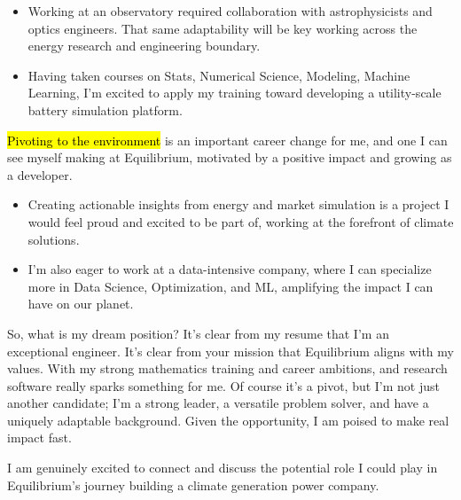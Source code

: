 \documentclass{tc_cv}
\begin{document}
\begin{adjustwidth}{38pt}{38pt}
\begin{itemize}
    \item Working at an observatory required collaboration with astrophysicists
      and optics engineers. That same adaptability will be key working across
      the energy research and engineering boundary.

    \item Having taken courses on Stats, Numerical Science, Modeling, Machine
      Learning, I'm excited to apply my training toward developing a
      utility-scale battery simulation platform.

  \end{itemize} \medbreak

  \hl{Pivoting to the environment} is an important career change for me, and
  one I can see myself making at Equilibrium, motivated by a positive impact
  and growing as a developer.
  \begin{itemize}

    \item Creating actionable insights from energy and market simulation is a
      project I would feel proud and excited to be part of, working at the
      forefront of climate solutions.

    \item I'm also eager to work at a data-intensive company, where I can
      specialize more in Data Science, Optimization, and ML, amplifying the
      impact I can have on our planet.

  \end{itemize} \medbreak

  So, what is my dream position? It's clear from my resume that I'm an
  exceptional engineer. It's clear from your mission that Equilibrium aligns
  with my values. With my strong mathematics training and career ambitions, and
  research software really sparks something for me. Of course it's a pivot, but
  I'm not just another candidate; I'm a strong leader, a versatile problem
  solver, and have a uniquely adaptable background. Given the opportunity, I am
  poised to make real impact fast. \medbreak

  I am genuinely excited to connect and discuss the potential role I could play
  in Equilibrium's journey building a climate generation power company.


\end{adjustwidth}
\end{document}
